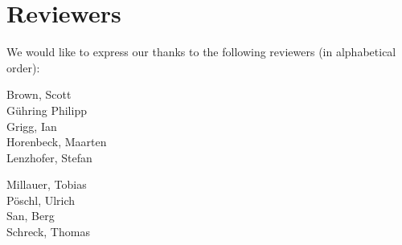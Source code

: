 \section{Reviewers}
\label{section:Reviewers}

We would like to express our thanks to the following reviewers (in alphabetical order):


\vline{}

\begin{minipage}[b]{0.5\linewidth}
\center
Brown, Scott \\
G\"uhring Philipp  \\
Grigg, Ian  \\
Horenbeck, Maarten \\
Lenzhofer, Stefan \\
\end{minipage}
\begin{minipage}[b]{0.5\linewidth}
\center
Millauer, Tobias \\
P\"oschl, Ulrich \\
San, Berg \\
Schreck, Thomas  \\
\end{minipage}


